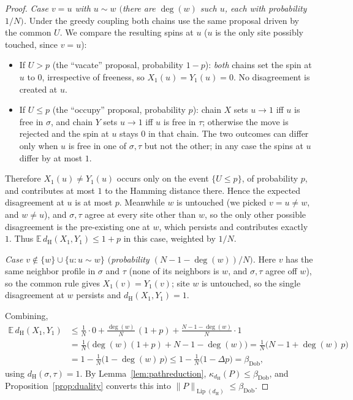 \documentclass{amsart}
\DeclareMathOperator{\Lip}{Lip}
\newcommand{\E}{\mathbb{E}}
\begin{document}
\begin{proof}
\smallskip
\noindent\emph{Case $v=u$ with $u\sim w$ $($there are $\deg(w)$ such $u$, each
with probability $1/N)$.} Under the greedy coupling both chains use the same
proposal driven by the common $U$. We compare the resulting spins at $u$
($u$ is the only site possibly touched, since $v=u$):
\begin{itemize}
\item If $U>p$ (the ``vacate'' proposal, probability $1-p$): \emph{both} chains
set the spin at $u$ to $0$, irrespective of freeness, so $X_1(u)=Y_1(u)=0$. No
disagreement is created at $u$.
\item If $U\le p$ (the ``occupy'' proposal, probability $p$): chain $X$ sets
$u\to1$ iff $u$ is free in $\sigma$, and chain $Y$ sets $u\to1$ iff $u$ is free
in $\tau$; otherwise the move is rejected and the spin at $u$ stays $0$ in that
chain. The two outcomes can differ only when $u$ is free in one of $\sigma,\tau$
but not the other; in any case the spins at $u$ differ by at most $1$.
\end{itemize}
Therefore $X_1(u)\neq Y_1(u)$ occurs only on the event $\{U\le p\}$, of
probability $p$, and contributes at most $1$ to the Hamming distance there. Hence
the expected disagreement at $u$ is at most $p$. Meanwhile $w$ is untouched (we
picked $v=u\neq w$, and $w\neq u$), and $\sigma,\tau$ agree at every site other
than $w$, so the only other possible disagreement is the pre-existing one at $w$,
which persists and contributes exactly $1$. Thus
$\E\,d_{\mathrm H}(X_1,Y_1)\le 1+p$ in this case, weighted by $1/N$.

\smallskip
\noindent\emph{Case $v\notin\{w\}\cup\{u:u\sim w\}$ $($probability
$(N-1-\deg(w))/N)$.} Here $v$ has the same neighbor profile in $\sigma$ and
$\tau$ (none of its neighbors is $w$, and $\sigma,\tau$ agree off $w$), so the
common rule gives $X_1(v)=Y_1(v)$; site $w$ is untouched, so the single
disagreement at $w$ persists and $d_{\mathrm H}(X_1,Y_1)=1$.

\smallskip
Combining,
\begin{align*}
\E\,d_{\mathrm H}(X_1,Y_1)
&\le \frac1N\cdot 0
+\frac{\deg(w)}{N}\,(1+p)
+\frac{N-1-\deg(w)}{N}\cdot 1\\
&=\frac{1}{N}\Big(\deg(w)(1+p)+N-1-\deg(w)\Big)
=\frac{1}{N}\Big(N-1+\deg(w)\,p\Big)\\
&=1-\frac1N\big(1-\deg(w)\,p\big)
\le 1-\frac1N\big(1-\Delta p\big)=\beta_{\mathrm{Dob}} ,
\end{align*}
using $d_{\mathrm H}(\sigma,\tau)=1$. By Lemma~\ref{lem:pathreduction},
$\kappa_{d_{\mathrm H}}(P)\le\beta_{\mathrm{Dob}}$, and
Proposition~\ref{prop:duality} converts this into
$\|P\|_{\Lip(d_{\mathrm H})}\le\beta_{\mathrm{Dob}}$.
\end{proof}
\end{document}
